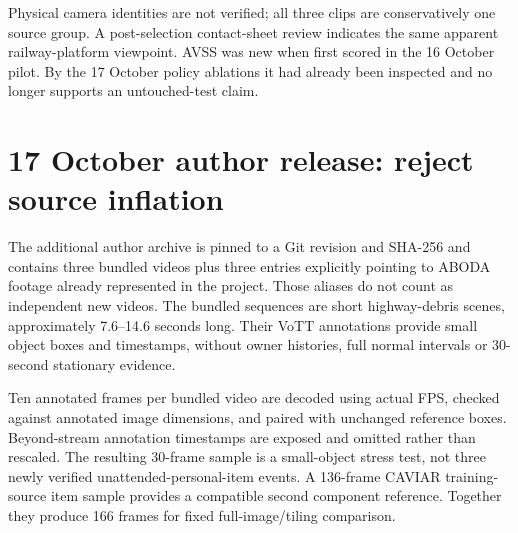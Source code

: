 Physical camera identities are not verified; all three clips are conservatively one source group. A post-selection contact-sheet review indicates the same apparent railway-platform viewpoint. AVSS was new when first scored in the 16 October pilot. By the 17 October policy ablations it had already been inspected and no longer supports an untouched-test claim.


\section{17 October author release: reject source inflation}
The additional author archive is pinned to a Git revision and SHA-256 and contains three bundled videos plus three entries explicitly pointing to ABODA footage already represented in the project. Those aliases do not count as independent new videos. The bundled sequences are short highway-debris scenes, approximately 7.6--14.6 seconds long. Their VoTT annotations provide small object boxes and timestamps, without owner histories, full normal intervals or 30-second stationary evidence.

Ten annotated frames per bundled video are decoded using actual FPS, checked against annotated image dimensions, and paired with unchanged reference boxes. Beyond-stream annotation timestamps are exposed and omitted rather than rescaled. The resulting 30-frame sample is a small-object stress test, not three newly verified unattended-personal-item events. A 136-frame CAVIAR training-source item sample provides a compatible second component reference. Together they produce 166 frames for fixed full-image/tiling comparison.

